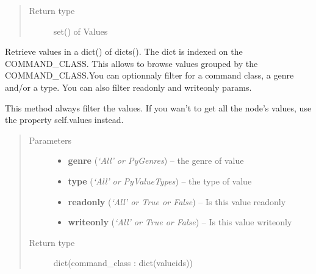 \documentclass[letterpaper,10pt,english]{sphinxmanual}
\begin{document}
\begin{fulllineitems}
\begin{fulllineitems}
\begin{quote}
\begin{description}
\begin{itemize}
\end{itemize}

\item[{Return type}] \leavevmode
set() of Values

\end{description}\end{quote}

\end{fulllineitems}


\begin{fulllineitems}
\label{node:openzwave.node.ZWaveNode.get_values_by_command_classes}
Retrieve values in a dict() of dicts(). The dict is indexed on the COMMAND\_CLASS.
This allows to browse values grouped by the COMMAND\_CLASS.You can optionnaly filter for a command class,
a genre and/or a type. You can also filter readonly and writeonly params.

This method always filter the values.
If you wan't to get all the node's values, use the property self.values instead.
\begin{quote}\begin{description}
\item[{Parameters}] \leavevmode\begin{itemize}
\item {} 
\textbf{genre} (\emph{`All' or PyGenres}) -- the genre of value

\item {} 
\textbf{type} (\emph{`All' or PyValueTypes}) -- the type of value

\item {} 
\textbf{readonly} (\emph{`All' or True or False}) -- Is this value readonly

\item {} 
\textbf{writeonly} (\emph{`All' or True or False}) -- Is this value writeonly

\end{itemize}

\item[{Return type}] \leavevmode
dict(command\_class : dict(valueids))

\end{description}\end{quote}


\end{fulllineitems}
\end{fulllineitems}
\end{document}
